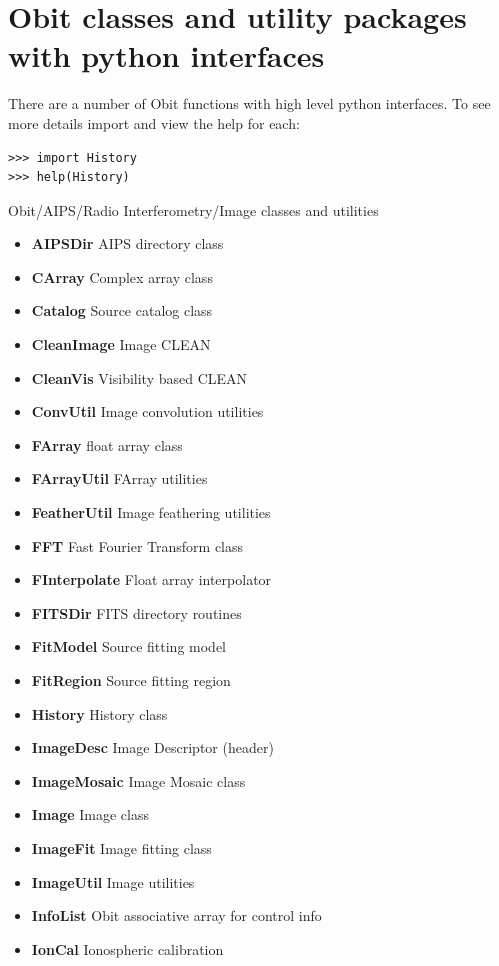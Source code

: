 \documentclass[11pt]{report}
\begin{document}
\section{Obit classes and utility packages with python interfaces}
   There are a number of Obit functions with high level python
interfaces.  To see more details import and view the help for each:

\begin{verbatim}
>>> import History
>>> help(History)
\end{verbatim}

Obit/AIPS/Radio Interferometry/Image classes and utilities
\begin{itemize}
\item {\bf AIPSDir}        AIPS directory class
\item {\bf CArray}         Complex array class
\item {\bf Catalog}        Source catalog class
\item {\bf CleanImage}     Image CLEAN
\item {\bf CleanVis}       Visibility based CLEAN
\item {\bf ConvUtil}       Image convolution utilities
\item {\bf FArray}         float array class
\item {\bf FArrayUtil}     FArray utilities
\item {\bf FeatherUtil}    Image feathering utilities
\item {\bf FFT}            Fast Fourier Transform class
\item {\bf FInterpolate}   Float array interpolator
\item {\bf FITSDir}        FITS directory routines
\item {\bf FitModel}       Source fitting model
\item {\bf FitRegion}      Source fitting region
\item {\bf History}        History class
\item {\bf ImageDesc}      Image Descriptor (header)
\item {\bf ImageMosaic}    Image Mosaic class
\item {\bf Image}          Image class
\item {\bf ImageFit}       Image fitting class
\item {\bf ImageUtil}      Image utilities
\item {\bf InfoList}       Obit associative array for control info
\item {\bf IonCal}         Ionospheric calibration

\end{itemize}
\end{document}
